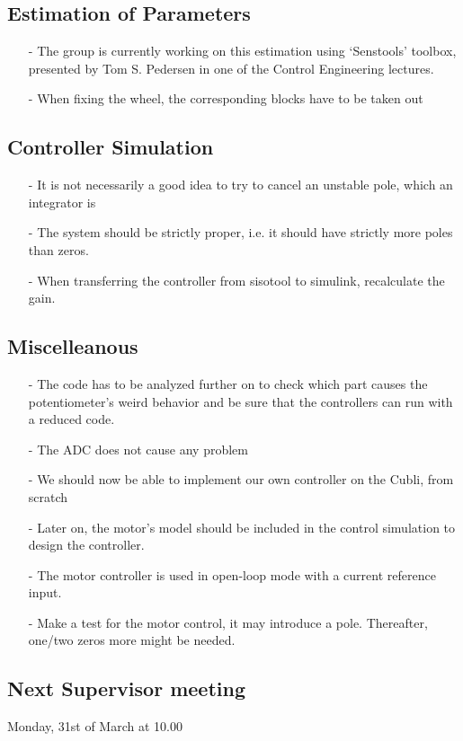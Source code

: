 \subsection{Estimation of Parameters}
\begin{itemize}
  \item[-] The group is currently working on this estimation using `Senstools' toolbox, presented by Tom S. Pedersen in one of the Control Engineering lectures. 
  \item[-] When fixing the wheel, the corresponding blocks have to be taken out
\end{itemize}

\subsection{Controller Simulation}
\begin{itemize}
  \item[-] It is not necessarily a good idea to try to cancel an unstable pole, which an integrator is
  \item[-] The system should be strictly proper, i.e. it should have strictly more poles than zeros.
  \item[-] When transferring the controller from sisotool to simulink, recalculate the gain.
\end{itemize}

\subsection{Miscelleanous}
\begin{itemize}
  \item[-] The code has to be analyzed further on to check which part causes the potentiometer's weird behavior and be sure that the controllers can run with a reduced code.
  \item[-] The ADC does not cause any problem
  \item[-] We should now be able to implement our own controller on the Cubli, from scratch
  \item[-] Later on, the motor's model should be included in the control simulation to design the controller.
  \item[-] The motor controller is used in open-loop mode with a current reference input.
  \item[-] Make a test for the motor control, it may introduce a pole. Thereafter, one/two zeros more might be needed.
\end{itemize}

\subsection{Next Supervisor meeting}
Monday, 31st of March at 10.00

